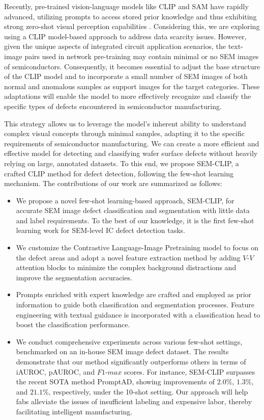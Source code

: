 Recently, pre-trained vision-language models like CLIP \cite{radford2021learning} and SAM \cite{kirillov2023segany} have rapidly advanced, utilizing prompts to access stored prior knowledge and thus exhibiting strong zero-shot visual perception capabilities \cite{Li_Li_Li_Niebles_Hoi_2022}. Considering this, we are exploring using a CLIP model-based approach to address data scarcity issues. However, given the unique aspects of integrated circuit application scenarios, the text-image pairs used in network pre-training may contain minimal or no SEM images of semiconductors. Consequently, it becomes essential to adjust the base structure of the CLIP model and to incorporate a small number of SEM images of both normal and anomalous samples as support images for the target categories. These adaptations will enable the model to more effectively recognize and classify the specific types of defects encountered in semiconductor manufacturing.

This strategy allows us to leverage the model's inherent ability to understand complex visual concepts through minimal samples, adapting it to the specific requirements of semiconductor manufacturing. We can create a more efficient and effective model for detecting and classifying wafer surface defects without heavily relying on large, annotated datasets. To this end, we propose SEM-CLIP, a crafted CLIP method for defect detection, following the few-shot learning mechanism. The contributions of our work are summarized as follows:
\begin{itemize}
    \item We propose a novel few-shot learning-based approach, SEM-CLIP, for accurate SEM image defect classification and segmentation with little data and label requirements. To the best of our knowledge, it is the first few-shot learning work for SEM-level IC defect detection tasks. 
    \item We customize the Contrastive Language-Image Pretraining model to focus on the defect areas and adopt a novel feature extraction method by adding $V$-$V$ attention blocks to minimize the complex background distractions and improve the segmentation accuracies.
    \item Prompts enriched with expert knowledge are crafted and employed as prior information to guide both classification and segmentation processes. Feature engineering with textual guidance is incorporated with a classification head to boost the classification performance. 
    \item We conduct comprehensive experiments across various few-shot settings, benchmarked on an in-house SEM image defect dataset. The results demonstrate that our method significantly outperforms others in terms of iAUROC, pAUROC, and $F1$-$max$ scores. For instance, 
    SEM-CLIP surpasses the recent SOTA method PromptAD, showing improvements of $2.0\%$, $1.3\%$, and $21.1\%$, respectively, under the 10-shot setting. Our approach will help fabs alleviate the issues of insufficient labeling and expensive labor, thereby facilitating intelligent manufacturing.
    
\end{itemize}

